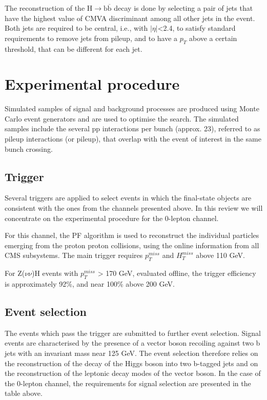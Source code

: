\documentclass[EPJ,twocolumn]{webofc}
\begin{document}
The reconstruction of the $\text{H} \rightarrow \text{b}\overline{\text{b}}$ decay is done by selecting a pair of jets that have the highest value of CMVA discriminant among all other jets in the event. Both jets are required to be central, i.e., with $|\eta|$<2.4, to satisfy standard requirements to remove jets from pileup, and to have a  $p_{T}$ above a certain threshold, that can be different for each jet.


\section{Experimental procedure}

Simulated samples of signal and background processes are produced using Monte Carlo event generators and are used to optimise the search.
The simulated samples include the several pp interactions per bunch (approx. 23), referred to as pileup interactions (or pileup), that overlap with the event of interest in the same bunch crossing.

\subsection*{Trigger}

Several triggers are applied to select events in which the final-state objects are consistent with the ones from the channels presented above. In this review we will concentrate on the experimental procedure for the 0-lepton channel.

For this channel, the PF algorithm is used to reconstruct the individual particles emerging from the proton proton collisions, using the online information from all CMS subsystems. The main trigger requires $p_T^{miss}$ and $H_T^{miss}$ above 110 GeV.

For Z($\nu\nu$)H events with
$p_T^{miss}$ > 170 GeV, evaluated offline, the trigger efficiency is approximately 92\%, and near 100\%
above 200 GeV.

\subsection*{Event selection}

The events which pass the trigger are submitted to further event selection. Signal events are characterised by the presence of a vector boson recoiling against two b jets with an invariant mass near 125 GeV. The event selection therefore relies on the reconstruction of the decay of the Higgs boson into two b-tagged jets and on the reconstruction of the leptonic decay modes of the vector boson. In the case of the 0-lepton channel, the requirements for signal selection are presented in the table above.
\end{document}
